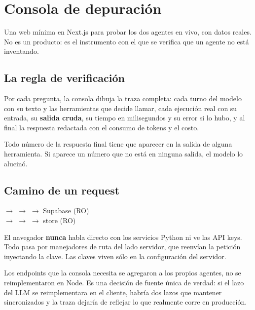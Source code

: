 \section{Consola de depuración}

Una web mínima en Next.js para probar los dos agentes en vivo, con datos reales. No es
un producto: es el instrumento con el que se verifica que un agente no está inventando.

\subsection{La regla de verificación}

Por cada pregunta, la consola dibuja la traza completa: cada turno del modelo con su
texto y las herramientas que decide llamar, cada ejecución real con su entrada, su
\textbf{salida cruda}, su tiempo en milisegundos y su error si lo hubo, y al final la
respuesta redactada con el consumo de tokens y el costo.

\begin{clave}[title=Regla de oro]
Todo número de la respuesta final tiene que aparecer en la salida de alguna herramienta.
Si aparece un número que no está en ninguna salida, el modelo lo alucinó.
\end{clave}

\subsection{Camino de un request}

\begin{center}
\small
{} $\to$  $\to$  $\to$ Supabase (RO) \\[2pt]
 $\to$  $\to$  $\to$ store (RO)
\end{center}

El navegador \textbf{nunca} habla directo con los servicios Python ni ve las API keys.
Todo pasa por manejadores de ruta del lado servidor, que reenvían la petición inyectando
la clave. Las claves viven sólo en la configuración del servidor.

Los endpoints que la consola necesita se agregaron a los propios agentes, no se
reimplementaron en Node. Es una decisión de fuente única de verdad: si el lazo del LLM se
reimplementara en el cliente, habría dos lazos que mantener sincronizados y la traza
dejaría de reflejar lo que realmente corre en producción.

